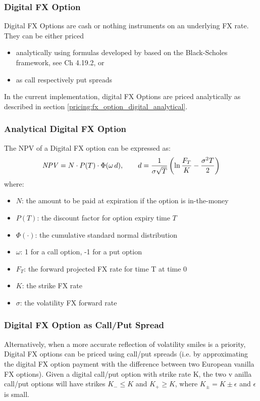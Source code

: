 \subsubsection{Digital FX Option}
\label{pricing:fx_digitaloption}

Digital FX Options are cash or nothing instruments on an underlying FX rate.
They can be either priced 
\begin{itemize}
\item analytically using formulas developed by \cite{Rubinstein_1991} 
based on the Black-Scholes framework, see \cite{Haug_1997} Ch 4.19.2, or
\item as call respectively put spreads
\end{itemize}

In the current implementation, digital FX Options are priced analytically as described in section
\ref{pricing:fx_option_digital_analytical}.

\subsubsection*{Analytical Digital FX Option}\label{pricing:fx_option_digital_analytical}

The NPV of a Digital FX option can be expressed as:
$$
\mathit{NPV} = N \cdot P(T)\cdot \Phi(\omega\,d), \qquad d = \frac{1}{\sigma\sqrt{T}}\left(\ln\frac{F_T}{K} - \frac{\sigma^2 T}{2}\right)
$$
where:
\begin{itemize}
\item $N$: the amount to be paid at expiration if the option is in-the-money
\item $P(T)$: the discount factor for option expiry time $T$
\item $\Phi(\cdot)$: the cumulative standard normal distribution
\item $\omega$: 1 for a call option, -1 for a put option
\item $F_T$: the forward projected FX rate for time T at time 0  
\item $K$: the strike FX rate
\item $\sigma$: the volatility FX forward rate
\end{itemize}

\subsubsection*{Digital FX Option as Call/Put Spread}\label{pricing:fx_option_digital_callspread}

Alternatively, when a more accurate reflection of volatility smiles is a priority, 
Digital FX options can be priced using call/put spreads (i.e. by approximating 
the digital FX option payment with the difference between two European vanilla 
FX options). Given a digital call/put option with strike rate K, the two v
anilla call/put options will have strikes $K_- \leq K$ and $K_+\geq K$, where 
$K_\pm=K \pm\epsilon$ and $\epsilon$ is small.


